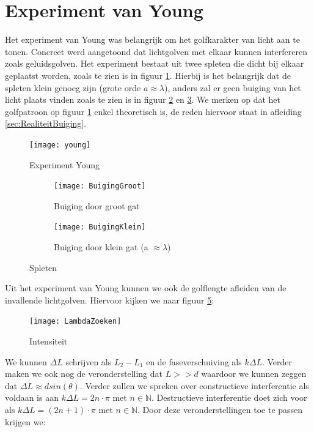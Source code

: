 \documentclass[a4paper,kul]{kulakarticle} %
\begin{document}
\newpage
\section{Experiment van Young}
\label{sec:young}
Het experiment van Young was belangrijk om het golfkarakter van licht aan te tonen. Concreet werd aangetoond dat lichtgolven met elkaar kunnen interfereren zoals geluidsgolven. Het experiment bestaat uit twee spleten die dicht bij elkaar geplaatst worden, zoals te zien is in figuur \ref{fig:young}. Hierbij is het belangrijk dat de spleten klein genoeg zijn (grote orde $a\approx\lambda$), anders zal er geen buiging van het licht plaats vinden zoals te zien is in figuur \ref{fig:buiginggroot} en \ref{fig:buigingklein}. We merken op dat het golfpatroon op figuur \ref{fig:young} enkel theoretisch is, de reden hiervoor staat in afleiding \ref{sec:RealiteitBuiging}.
\begin{figure}[!h]
	\centering
	\texttt{[image: young]}
	\caption[Experiment Young]{Experiment Young}
	\label{fig:young}
\end{figure}
\begin{figure}[!h]
	\centering
	\begin{subfigure}{.5\textwidth}
		\centering
		\texttt{[image: BuigingGroot]}
		\caption[Buiging grote doorlating]{Buiging door groot gat}
		\label{fig:buiginggroot}
	\end{subfigure}%
	\begin{subfigure}{.5\textwidth}
		\centering
		\texttt{[image: BuigingKlein]}
		\caption[Buiging kleine doorlating]{Buiging door klein gat (a $\approx \lambda$)}
		\label{fig:buigingklein}
	\end{subfigure}
	\caption{Spleten}
	\label{fig:Spleten}
\end{figure}
\newpage
Uit het experiment van Young kunnen we ook de golflengte afleiden van de invallende lichtgolven. Hiervoor kijken we naar figuur \ref{fig:lambdazoeken}:
\begin{figure}[!h]
	\centering
	\texttt{[image: LambdaZoeken]}
	\caption[Berekening intensiteit]{Intensiteit}
	\label{fig:lambdazoeken}
\end{figure}
We kunnen $\Delta L$ schrijven als $L_2-L_1$ en de faseverschuiving als $k\Delta L$. Verder maken we ook nog de veronderstelling dat $L>>d$ waardoor we kunnen zeggen dat $\Delta L \approx dsin(\theta)$. Verder zullen we spreken over constructieve interferentie als voldaan is aan $k\Delta L = 2n\cdot\pi$ met $n\in\mathbb{N}$. Destructieve interferentie doet zich voor als $k\Delta L = (2n+1)\cdot\pi$ met $n\in\mathbb{N}$. Door deze veronderstellingen toe te passen krijgen we:
\end{document}
